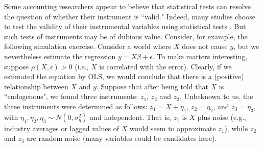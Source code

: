 \documentclass[12pt,reqno,titlepage]{amsart}
\begin{document}
\begin{doublespace}
Some accounting researchers appear to believe that statistical tests can resolve the question of whether their instrument is ``valid."
Indeed, many studies choose to test the validity of their instrumental variables using statistical tests \citep[see][]{Larcker:2010fq}.
%
%
But such tests of instruments may be of dubious value. 
Consider, for example, the following simulation exercise.
Consider a world where $X$ does not cause $y$, but we nevertheless estimate the regression $y = X \beta + \epsilon$. To make matters
interesting, suppose $\rho(X, \epsilon) > 0$ (i.e., $X$ is correlated with the error). Clearly, if we estimated the equation by OLS, we would
conclude that there is a (positive) relationship between $X$ and $y$. Suppose that after being told that $X$ is ``endogenous", we found
three instruments: $z_1$, $z_2$ and $z_3$. Unbeknown to us, the three instruments were determined as follows:
$z_1 = X +\eta_1$, $z_2 = \eta_2$, and $z_3 = \eta_3$, with $\eta_1, \eta_2,  \eta_3 \sim N(0, \sigma_{\eta}^2)$ and independent. 
That is, $z_1$ is $X$ plus noise (e.g., industry averages or lagged values of $X$ would seem to approximate $z_1$), while $z_2$ and $z_3$ are random noise (many variables could be candidates here).


\end{doublespace}
\end{document}
